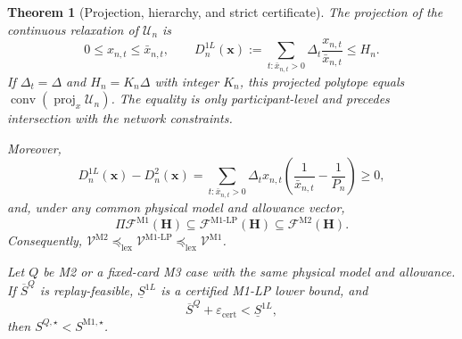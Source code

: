 \documentclass[10pt,journal,onecolumn]{IEEEtran}
\newtheorem{theorem}{Theorem}[section]
\newcommand{\Mone}{\ensuremath{\mathrm{M1}}}
\newcommand{\MoneLP}{\ensuremath{\mathrm{M1\text{-}LP}}}
\newcommand{\Mtwo}{\ensuremath{\mathrm{M2}}}
\newcommand{\lexleq}{\preceq_{\mathrm{lex}}}
\newcommand{\eps}{\varepsilon}
\begin{document}
\begin{theorem}[Projection, hierarchy, and strict certificate]
\label{thm:report_hierarchy}
The projection of the continuous relaxation of $\mathcal U_n$ is
\begin{equation}
0\leq x_{n,t}\leq\bar x_{n,t},
\qquad
D_n^{1L}(\bm x)
:=\sum_{t:\bar x_{n,t}>0}\Delta_t
\frac{x_{n,t}}{\bar x_{n,t}}
\leq H_n.
\label{eq:report_m1lp}
\end{equation}
If $\Delta_t=\Delta$ and $H_n=K_n\Delta$ with integer $K_n$, this projected
polytope equals $\operatorname{conv}(\operatorname{proj}_x\mathcal U_n)$.
The equality is only participant-level and precedes intersection with the
network constraints.

Moreover,
\begin{equation}
D_n^{1L}(\bm x)-D_n^2(\bm x)
=\sum_{t:\bar x_{n,t}>0}\Delta_tx_{n,t}
\left(\frac1{\bar x_{n,t}}-\frac1{P_n}\right)\geq0,
\label{eq:report_gap}
\end{equation}
and, under any common physical model and allowance vector,
\begin{equation}
\Pi\mathcal F^{\Mone}(\bm H)
\subseteq\mathcal F^{\MoneLP}(\bm H)
\subseteq\mathcal F^{\Mtwo}(\bm H).
\label{eq:report_hierarchy}
\end{equation}
Consequently,
$\mathcal V^{\Mtwo}\lexleq\mathcal V^{\MoneLP}
\lexleq\mathcal V^{\Mone}$.

Let $Q$ be M2 or a fixed-card M3 case with the same physical model and
allowance. If $\overline S^Q$ is replay-feasible,
$\underline S^{1L}$ is a certified M1-LP lower bound, and
\begin{equation}
\overline S^Q+\eps_{\mathrm{cert}}<\underline S^{1L},
\label{eq:report_strict}
\end{equation}
then $S^{Q,\star}<S^{\Mone,\star}$.
\end{theorem}
\end{document}
